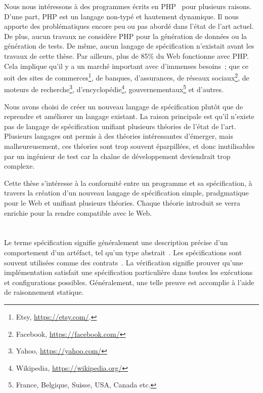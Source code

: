 Nous nous intéressons à des programmes écrits en PHP~\cite{PHP} pour plusieurs
raisons. D'une part, PHP est un langage non-typé et hautement dynamique. Il nous
apporte des problématiques encore peu ou pas abordé dans l'état de l'art actuel.
De plus, aucun travaux ne considère PHP pour la génération de données ou la
génération de tests. De même, aucun langage de spécification n'existait avant
les travaux de cette thèse. Par ailleurs, plus de 85\% du Web fonctionne avec
PHP. Cela implique qu'il y a un marché important avec d'immenses besoins~; que
ce soit des sites de commerces\footnote{Etsy, \url{https://etsy.com/}.}, de
banques, d'assurances, de réseaux sociaux\footnote{Facebook,
\url{https://facebook.com/}}, de moteurs de recherche\footnote{Yahoo,
\url{https://yahoo.com/}}, d'encyclopédie\footnote{Wikipedia,
\url{https://wikipedia.org/}}, gouvernementaux\footnote{France, Belgique,
Suisse, USA, Canada etc.} et d'autres.

Nous avons choisi de créer un nouveau langage de spécification plutôt que de
reprendre et améliorer un langage existant.
La raison principale est qu'il n'existe pas de langage de spécification unifiant
plusieurs théories de l'état de l'art. Plusieurs langages ont permis à des
théories intéressantes d'émerger, mais malheureusement, ces théories sont
trop souvent éparpillées, et donc inutilisables par un ingénieur de test car la
chaîne de développement deviendrait trop complexe.

Cette thèse s'intéresse à la conformité entre un programme et sa spécification,
à travers la création d'un nouveau langage de spécification simple, pradgmatique
pour le Web et unifiant plusieurs théories. Chaque théorie introduit se verra
enrichie pour la rendre compatible avec le Web.

\section{}

Le terme {\strong spécification} signifie généralement une description précise
d'un comportement d'un artéfact, tel qu'un type abstrait~\cite{LiskovZ74}. Les
spécifications sont souvent utilisées comme des contrats~\cite{Meyer92}. La
{\strong vérification} signifie prouver qu'une implémentation satisfait une
spécification particulière dans toutes les exécutions et configurations
possibles. Généralement, une telle preuve est accomplie à l'aide de raisonnement
statique.%

